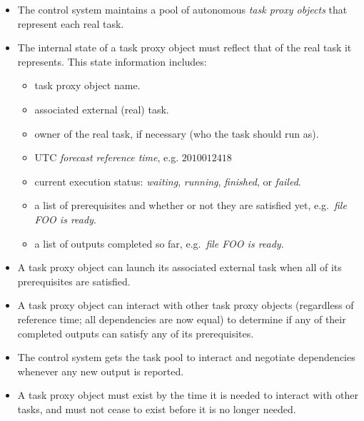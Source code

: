 \begin{itemize}
    \item The control system maintains a pool of autonomous {\em task
        proxy objects} that represent each real task. 
       
    \item The internal state of a task proxy object must reflect that
        of the real task it represents. This state information includes:

        \begin{itemize}

            \item task proxy object name.

            \item associated external (real) task.  

            \item owner of the real task, if necessary (who the task
                should run as).

            \item UTC {\em forecast reference time}, e.g. $2010012418$
        
            \item current execution status: {\em waiting}, {\em running}, 
                {\em finished}, or {\em failed}. 

            \item a list of prerequisites and whether or not they are
                satisfied yet, e.g.\ {\em file FOO is ready}. 

            \item a list of outputs completed so far, e.g.\ {\em file
                FOO is ready}.

        \end{itemize}
       
    \item A task proxy object can launch its associated external task
        when all of its prerequisites are satisfied.

    \item A task proxy object can interact with other task proxy
        objects (regardless of reference time; all dependencies are now
        equal) to determine if any of their completed outputs can
        satisfy any of its prerequisites.

    \item The control system gets the task pool to interact and
        negotiate dependencies whenever any new output is reported.
 
    \item A task proxy object must exist by the time it is needed to
        interact with other tasks, and must not cease to exist before
        it is no longer needed.

\end{itemize}

